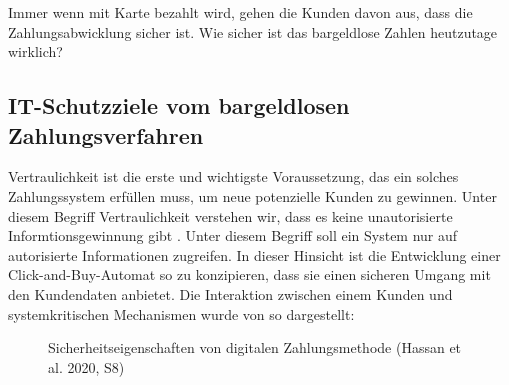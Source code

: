 Immer wenn mit Karte bezahlt wird, gehen die Kunden davon aus, dass die Zahlungsabwicklung sicher ist. 
Wie sicher ist das bargeldlose Zahlen heutzutage wirklich? 


\subsection{IT-Schutzziele vom bargeldlosen Zahlungsverfahren}


Vertraulichkeit ist die erste und  wichtigste Voraussetzung, das ein solches Zahlungssystem erfüllen muss, 
um neue potenzielle Kunden zu gewinnen. Unter diesem Begriff Vertraulichkeit verstehen wir, dass es keine 
unautorisierte Informtionsgewinnung gibt \cite{refbook:SWIS}. Unter diesem Begriff soll ein System nur auf
autorisierte Informationen zugreifen. In dieser Hinsicht ist die Entwicklung einer Click-and-Buy-Automat 
so zu konzipieren, dass sie einen sicheren Umgang mit den Kundendaten anbietet. Die Interaktion zwischen
einem Kunden und systemkritischen Mechanismen wurde von \cite{refart:HARE} so dargestellt:

\vfill
\begin{figure}[htb]
    \caption{Sicherheitseigenschaften von digitalen Zahlungsmethode (Hassan et al. 2020, S8)}
    \label{fig:refark_HARE}
\end{figure}
\vfill


